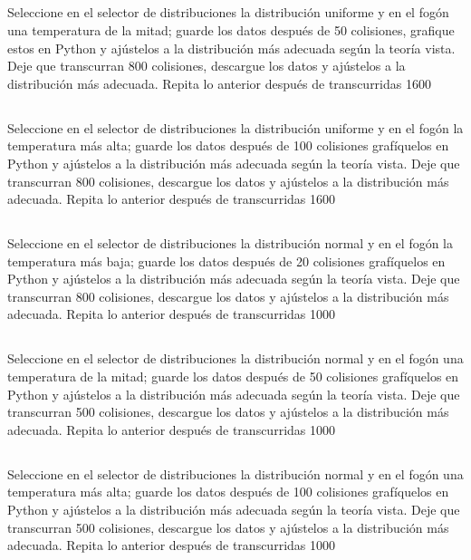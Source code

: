 \documentclass[11pt]{article}
\begin{document}
\subsection{}
Seleccione en el selector de distribuciones la distribución uniforme y en el fogón una temperatura de la mitad; guarde los datos después de 50 colisiones, grafique estos en Python y ajústelos a la distribución más adecuada según la teoría vista. Deje que transcurran 800 colisiones, descargue los datos y ajústelos a la distribución más adecuada. Repita lo anterior después de transcurridas 1600

\subsection{}
Seleccione en el selector de distribuciones la distribución uniforme y en el fogón la temperatura más alta; guarde los datos después de 100 colisiones grafíquelos en Python y ajústelos a la distribución más adecuada según la teoría vista. Deje que transcurran 800 colisiones, descargue los datos y ajústelos a la distribución más adecuada. Repita lo anterior después de transcurridas 1600

\subsection{}
Seleccione en el selector de distribuciones la distribución normal y en el fogón la temperatura más baja; guarde los datos después de 20 colisiones grafíquelos en Python y ajústelos a la distribución más adecuada según la teoría vista. Deje que transcurran 800 colisiones, descargue los datos y ajústelos a la distribución más adecuada. Repita lo anterior después de transcurridas 1000

\subsection{}
Seleccione en el selector de distribuciones la distribución normal y en el fogón una temperatura de la mitad; guarde los datos después de 50 colisiones grafíquelos en Python y ajústelos a la distribución más adecuada según la teoría vista. Deje que transcurran 500 colisiones, descargue los datos y ajústelos a la distribución más adecuada. Repita lo anterior después de transcurridas 1000

\subsection{}
Seleccione en el selector de distribuciones la distribución normal y en el fogón una temperatura más alta; guarde los datos después de 100 colisiones grafíquelos en Python y ajústelos a la distribución más adecuada según la teoría vista. Deje que transcurran 500 colisiones, descargue los datos y ajústelos a la distribución más adecuada. Repita lo anterior después de transcurridas 1000
\end{document}
